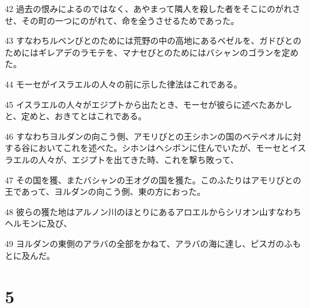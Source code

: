 \par 42 過去の恨みによるのではなく、あやまって隣人を殺した者をそこにのがれさせ、その町の一つにのがれて、命を全うさせるためであった。
\par 43 すなわちルベンびとのためには荒野の中の高地にあるベゼルを、ガドびとのためにはギレアデのラモテを、マナセびとのためにはバシャンのゴランを定めた。
\par 44 モーセがイスラエルの人々の前に示した律法はこれである。
\par 45 イスラエルの人々がエジプトから出たとき、モーセが彼らに述べたあかしと、定めと、おきてとはこれである。
\par 46 すなわちヨルダンの向こう側、アモリびとの王シホンの国のベテペオルに対する谷においてこれを述べた。シホンはヘシボンに住んでいたが、モーセとイスラエルの人々が、エジプトを出てきた時、これを撃ち敗って、
\par 47 その国を獲、またバシャンの王オグの国を獲た。このふたりはアモリびとの王であって、ヨルダンの向こう側、東の方におった。
\par 48 彼らの獲た地はアルノン川のほとりにあるアロエルからシリオン山すなわちヘルモンに及び、
\par 49 ヨルダンの東側のアラバの全部をかねて、アラバの海に達し、ピスガのふもとに及んだ。

\chapter{5}

